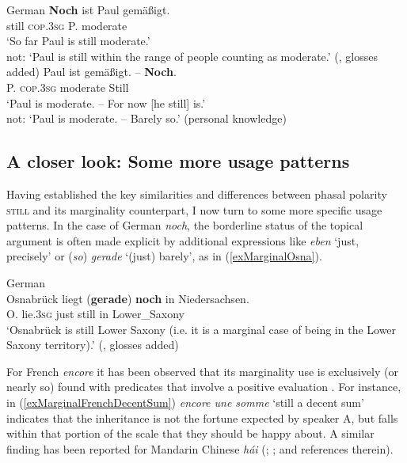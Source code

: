 \begin{exe}
	\ex 
	\begin{xlist}
		\exi{}German
		\ex \label{exMarginalGermanForefield}
		\gll \textbf{Noch} ist Paul gemäßigt.\\
		still \textsc{cop}.3\textsc{sg} P. moderate\\
		\glt \lq So far Paul is still moderate.'\\
		not: \lq Paul is still within the range of people counting as moderate.' (\cite[55]{Koenig1991}, glosses added)
	\ex \label{exMarginalGermanIsolated}
	\gll Paul ist gemäßigt. – \textbf{Noch}.\\
	P. \textsc{cop}.3\textsc{sg} moderate {} Still\\
	\glt \lq Paul is moderate. -- For now [he still] is.'\\
	not: \lq Paul is moderate. -- Barely so.' (personal knowledge)
\end{xlist}
\end{exe}

\subsection[tocentry={}]{A closer look: Some more usage patterns} Having established the key similarities and differences between phasal polarity \textsc{still} and its marginality counterpart, I now turn to some more specific usage patterns. In the case of German \textit{noch}, the borderline status of the topical argument is often made explicit by additional expressions like \textit{eben} \lq just, precisely\rq{ }or (\textit{so}) \textit{gerade} \lq (just) barely\rq{}, as in (\ref{exMarginalOsna}).

\begin{exe}
	\ex German\label{exMarginalOsna}\\
	\gll Osnabrück liegt \textup{(}\textbf{gerade}\textup{)} \textbf{noch} in Niedersachsen.\\
	O. lie.3\textsc{sg} \phantom{(}just still in Lower\_Saxony\\
	\glt \lq Osnabrück is still Lower Saxony (i.e.  it is a marginal case of being in the Lower Saxony territory).' (\cite[1843]{Umbach2012}, glosses added)
\end{exe}

For French \textit{encore} it has been observed that its marginality use is exclusively (or nearly so) found with predicates that involve a positive evaluation \parencite[176]{MosegaardHansen2008}. For instance, in (\ref{exMarginalFrenchDecentSum}) \textit{encore une somme} \lq still a decent sum' indicates that the inheritance is not the fortune expected by speaker A, but falls within that portion of the scale that they should be happy about. A similar finding has been reported for Mandarin Chinese \textit{hái} (\cite{Yeh1998}; \cite{Lu2019}; and references therein).

